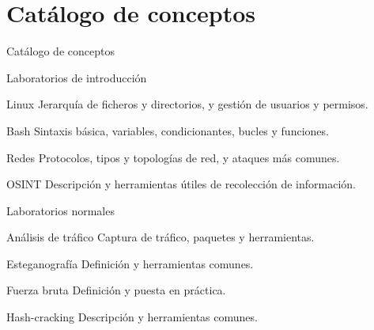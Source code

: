 \section{Catálogo de conceptos}

    \begin{frame}
        \Huge{\centerline{Catálogo de conceptos}}
    \end{frame}

    \begin{frame}{Laboratorios de introducción}
        \begin{block}{Linux}
            Jerarquía de ficheros y directorios, y gestión de usuarios y permisos.
        \end{block}
        \begin{block}{Bash}
            Sintaxis básica, variables, condicionantes, bucles y funciones.
        \end{block}

        \begin{block}{Redes}
            Protocolos, tipos y topologías de red, y ataques más comunes.
        \end{block}

        \begin{block}{OSINT}
            Descripción y herramientas útiles de recolección de información.
        \end{block}
    \end{frame}
    
    \begin{frame}{Laboratorios normales}
        \begin{block}{Análisis de tráfico}
            Captura de tráfico, paquetes y herramientas.
        \end{block}

        \begin{block}{Esteganografía}
            Definición y herramientas comunes.
        \end{block}

        \begin{block}{Fuerza bruta}
            Definición y puesta en práctica.
        \end{block}

        \begin{block}{Hash-cracking}
            Descripción y herramientas comunes.
        \end{block}
    \end{frame}
    
